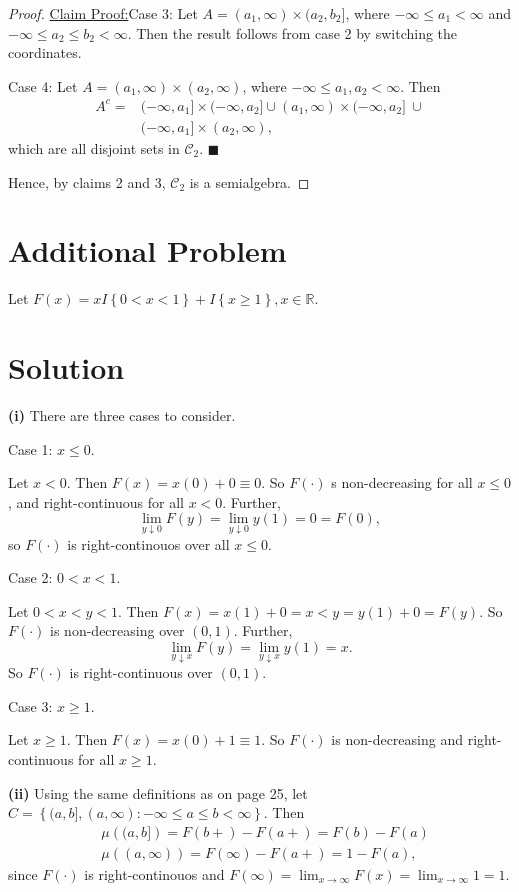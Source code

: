 \documentclass[12pt]{article}
\newenvironment{claimproof}[1]{\par\noindent\underline{Claim Proof:}\space#1}{\hfill $\blacksquare$}
\begin{document}
\begin{proof}
\begin{claimproof}
Case 3: Let $A = (a_{1}, \infty) \times (a_{2}, b_{2}]$, where $-\infty \leq a_{1} < \infty$ and $-\infty \leq a_{2} \leq b_{2} < \infty$. Then the
result follows from case 2 by switching the coordinates.

Case 4: Let $A = (a_{1}, \infty) \times (a_{2}, \infty)$, where $-\infty \leq a_{1}, a_{2} < \infty$. Then
\begin{align*}
A^{c} = & (-\infty, a_{1}] \times (-\infty, a_{2}] \cup (a_{1},\infty) \times (-\infty, a_{2}]\ \cup \\
& (-\infty, a_{1}] \times (a_{2}, \infty),
\end{align*}
which are all disjoint sets in $\mathcal{C}_{2}$.
\end{claimproof}

Hence, by claims 2 and 3, $\mathcal{C}_{2}$ is a semialgebra.
\end{proof}


\newpage 
\section*{Additional Problem}

Let $F(x) = xI\left\{ 0 < x < 1 \right\} + I\left\{ x \geq 1 \right\}, x \in \mathbb{R}$.

\section*{Solution}

{\bf (i)} There are three cases to consider.

Case 1: $x \leq 0$.

Let $x < 0$. Then $F(x) = x(0) + 0 \equiv 0$. So $F(\cdot)$ s non-decreasing for all $x \leq 0$, and right-continuous for all $x < 0$. Further, 
\[ \lim_{y\downarrow 0}F(y) = \lim_{y\downarrow 0}y(1) = 0 = F(0), \]
so $F(\cdot)$ is right-continouos over all $x \leq 0$.

Case 2: $0 < x < 1$.

Let $0 < x < y < 1$. Then $F(x) = x(1) + 0 = x < y = y(1) + 0 = F(y)$. So $F(\cdot)$ is non-decreasing over $(0,1)$. Further, 
\[ \lim_{y\downarrow x}F(y) = \lim_{y\downarrow x}y(1) = x. \]
So $F(\cdot)$ is right-continuous over $(0,1)$.

Case 3: $x \geq 1$.

Let $x \geq 1$. Then $F(x) = x(0) + 1 \equiv 1$. So $F(\cdot)$ is non-decreasing and right-continuous for all $x \geq 1$.

{\bf (ii)} Using the same definitions as on page 25, let $C = \left\{ (a,b], (a, \infty) : -\infty \leq a \leq b < \infty \right\}$. Then
\begin{align*}
& \mu\left( (a,b] \right) = F(b+) - F(a+) = F(b) - F(a) \\
& \mu\left( (a, \infty) \right) = F(\infty) - F(a+) = 1 - F(a),
\end{align*}
since $F(\cdot)$ is right-continouos and $F(\infty) = \lim_{x\rightarrow\infty}F(x) = \lim_{x\rightarrow \infty} 1 = 1$.
\end{document}
